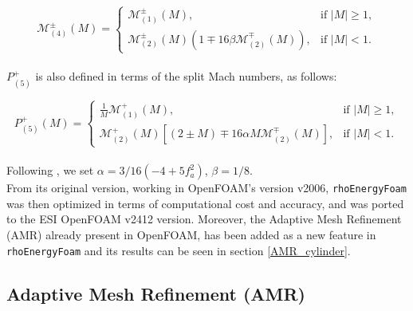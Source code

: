 \documentclass[a5paper]{sapthesis}
\begin{document}
	\begin{equation}
		\mathcal{M}_{(4)}^{\pm} (M) =
		\begin{cases}
			\mathcal{M}_{(1)}^{\pm} (M), & \text{if } |M| \geq 1, \\
			\mathcal{M}_{(2)}^{\pm} (M) (1 \mp 16 \beta \mathcal{M}_{(2)}^{\mp} (M)), & \text{if } |M| < 1.
		\end{cases}
	\end{equation}
	\\
	$P_{(5)}^+$ is also defined in terms of the split Mach numbers, as follows:
	
	\begin{equation}
		P_{(5)}^+ (M) =
		\begin{cases}
			\frac{1}{M} \mathcal{M}_{(1)}^{+} (M), & \text{if } |M| \geq 1, \\
			\mathcal{M}_{(2)}^{+} (M) [(2 \pm M) \mp 16 \alpha M \mathcal{M}_{(2)}^{\mp} (M)], & \text{if } |M| < 1.
		\end{cases}
	\end{equation}
	\\
	Following \citet{LIOU_AUSM+-up}, we set $\alpha = 3/16(-4 + 5 f_a^2)$, $\beta = 1/8$.
	\\
	From its original version, working in OpenFOAM's version v2006, \texttt{rhoEnergyFoam} was then optimized in terms of computational cost and accuracy, and was ported to the ESI OpenFOAM v2412 version. Moreover, the Adaptive Mesh Refinement (AMR) already present in OpenFOAM, has been added as a new feature in \texttt{rhoEnergyFoam} and its results can be seen in section \ref{AMR_cylinder}. 
	
	\subsection{Adaptive Mesh Refinement (AMR)}
	
\end{document}
